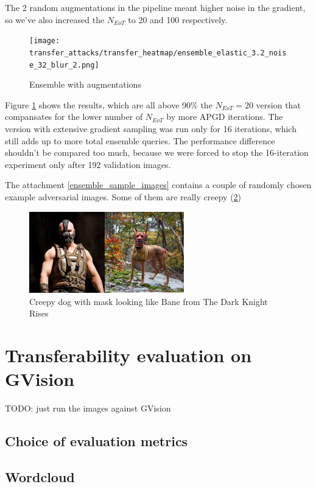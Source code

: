 The 2 random augmentations in the pipeline meant higher noise in the gradient, so we've also increased the $N_{EoT}$ to 20 and 100 respectively.

\begin{figure}
    \centering
    \texttt{[image: transfer\_attacks/transfer\_heatmap/ensemble\_elastic\_3.2\_noise\_32\_blur\_2.png]}
    \caption{Ensemble with augmentations}
    \label{fig:ensemble_augment}
\end{figure}

Figure \ref{fig:ensemble_augment} shows the results, which are all above 90\% the $N_{EoT}=20$ version that compansates for the lower number of $N_{EoT}$ by more APGD iterations. The version with extensive gradient sampling was run only for 16 iterations, which still adds up to more total ensemble queries. The performance difference shouldn't be compared too much, because we were forced to stop the 16-iteration experiment only after 192 validation images.

The attachment \ref{ensemble_sample_images} contains a couple of randomly chosen example adversarial images. Some of them are really creepy (\ref{fig:bane_dog})


\begin{figure}
    \centering
    \includegraphics[width=0.60\textwidth]{ae_samples/bane.png}
    \caption{Creepy dog with mask looking like Bane from The Dark Knight Rises}
    \label{fig:bane_dog}
\end{figure}

\pagebreak
\section{Transferability evaluation on GVision}
TODO: just run the images against GVision

\subsection{Choice of evaluation metrics}

\subsection{Wordcloud}